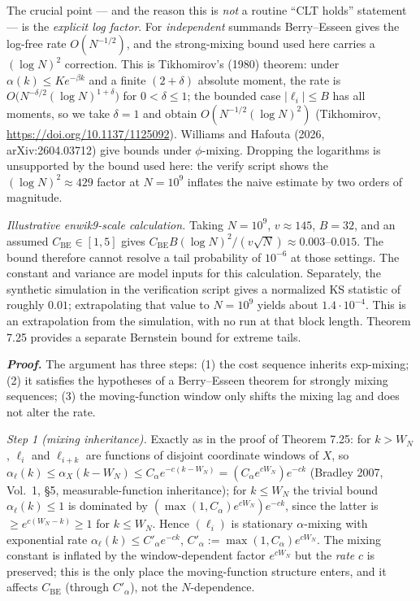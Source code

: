 \documentclass[
]{article}
\begin{document}
The crucial point --- and the reason this is \emph{not} a routine
``CLT holds'' statement --- is the \emph{explicit log factor}. For
\emph{independent} summands Berry--Esseen gives the log-free rate
$O(N^{-1/2})$, and the strong-mixing bound used here carries a
$(\log N)^2$ correction. This is Tikhomirov's (1980) theorem: under
$\alpha(k) \leq K e^{-\beta k}$ and a finite $(2+\delta)$ absolute
moment, the rate is $O\bigl(N^{-\delta/2}(\log N)^{1+\delta}\bigr)$ for
$0 < \delta \leq 1$; the bounded case $|\ell_i| \leq B$ has all moments,
so we take $\delta = 1$ and obtain $O(N^{-1/2}(\log N)^2)$
(Tikhomirov, \url{https://doi.org/10.1137/1125092}). Williams and
Hafouta (2026, arXiv:2604.03712) give bounds under $\phi$-mixing.
Dropping the logarithms is unsupported by the bound used here: the verify script shows
the $(\log N)^2 \approx 429$ factor at $N = 10^9$ inflates the naive
estimate by two orders of magnitude.

\emph{Illustrative enwik9-scale calculation.} Taking $N=10^9$,
$v \approx 145$, $B=32$, and an assumed $C_{\mathrm{BE}}\in[1,5]$ gives
$C_{\mathrm{BE}} B(\log N)^2/(v\sqrt{N})\approx 0.003$--$0.015$.
The bound therefore cannot resolve a tail probability of $10^{-6}$ at
those settings. The constant and variance are model inputs for this
calculation. Separately, the synthetic simulation in the verification
script gives a normalized KS statistic of roughly $0.01$; extrapolating
that value to $N=10^9$ yields about $1.4\cdot10^{-4}$. This is an
extrapolation from the simulation, with no run at that block length.
Theorem 7.25 provides a separate Bernstein bound for extreme tails.

\emph{\textbf{Proof.}} The argument has three steps: (1) the cost
sequence inherits exp-mixing; (2) it satisfies the hypotheses of a
Berry--Esseen theorem for strongly mixing sequences; (3) the
moving-function window only shifts the mixing lag and does not alter
the rate.

\emph{Step 1 (mixing inheritance).} Exactly as in the proof of
Theorem 7.25: for $k > W_N$, $\ell_i$ and $\ell_{i+k}$ are functions of
disjoint coordinate windows of $X$, so $\alpha_\ell(k) \leq
\alpha_X(k - W_N) \leq C_\alpha e^{-c(k - W_N)} = (C_\alpha e^{c W_N})
e^{-c k}$ (Bradley 2007, Vol.~1, §5, measurable-function inheritance);
for $k \leq W_N$ the trivial bound $\alpha_\ell(k) \leq 1$ is dominated
by $(\max(1,C_\alpha) e^{c W_N}) e^{-c k}$, since the latter is
$\geq e^{c(W_N - k)} \geq 1$ for $k \leq W_N$. Hence $(\ell_i)$ is
stationary $\alpha$-mixing with exponential rate $\alpha_\ell(k) \leq
C'_\alpha e^{-c k}$, $C'_\alpha := \max(1, C_\alpha) e^{c W_N}$. The
mixing constant is inflated by the window-dependent factor $e^{c W_N}$
but the \emph{rate} $c$ is preserved; this is the only place the
moving-function structure enters, and it affects $C_{\mathrm{BE}}$
(through $C'_\alpha$), not the $N$-dependence.
\end{document}
